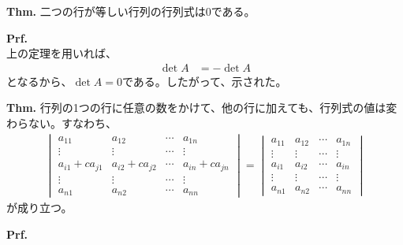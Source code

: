 \documentclass[a4paper,11pt]{jsarticle}
\numberwithin{equation}{section}
\begin{document}
\begin{itembox}[l]{\textbf{Thm.}}
  二つの行が等しい行列の行列式は$0$である。
\end{itembox}
\textbf{Prf.}\\
上の定理を用いれば、
\begin{align}
  \det A &= -\det A
\end{align}
となるから、$\det A = 0$である。したがって、示された。\hfill\qedsymbol\\

\begin{itembox}[l]{\textbf{Thm.}}
  行列の1つの行に任意の数をかけて、他の行に加えても、行列式の値は変わらない。すなわち、
  \begin{align}
    \begin{vmatrix}
      a_{11} & a_{12} & \cdots & a_{1n}\\
      \vdots & \vdots & \cdots & \vdots\\
      a_{i1}+ca_{j1} & a_{i2}+ca_{j2} & \cdots & a_{in}+ca_{jn}\\
      \vdots & \vdots & \cdots & \vdots\\
      a_{n1} & a_{n2} & \cdots & a_{nn}
    \end{vmatrix}
    =
    \begin{vmatrix}
      a_{11} & a_{12} & \cdots & a_{1n}\\
      \vdots & \vdots & \cdots & \vdots\\
      a_{i1} & a_{i2} & \cdots & a_{in}\\
      \vdots & \vdots & \cdots & \vdots\\
      a_{n1} & a_{n2} & \cdots & a_{nn}
    \end{vmatrix}
  \end{align}
  が成り立つ。
\end{itembox}
\textbf{Prf.}\\
\end{document}
